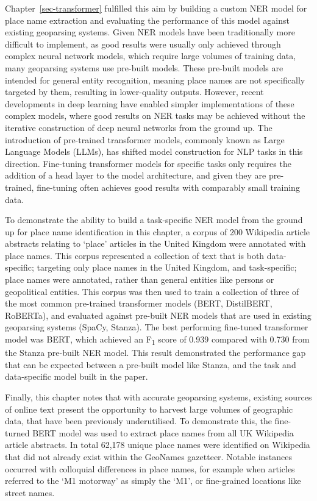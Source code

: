 \documentclass[
  letterpaper,
  11pt,
  english,
  onehalfspacing,
  headsepline]{MastersDoctoralThesis}
\begin{document}
Chapter~\ref{sec-transformer} fulfilled this aim by building a custom
NER model for place name extraction and evaluating the performance of
this model against existing geoparsing systems. Given NER models have
been traditionally more difficult to implement, as good results were
usually only achieved through complex neural network models, which
require large volumes of training data, many geoparsing systems use
pre-built models. These pre-built models are intended for general entity
recognition, meaning place names are not specifically targeted by them,
resulting in lower-quality outputs. However, recent developments in deep
learning have enabled simpler implementations of these complex models,
where good results on NER tasks may be achieved without the iterative
construction of deep neural networks from the ground up. The
introduction of pre-trained transformer models, commonly known as Large
Language Models (LLMs), has shifted model construction for NLP tasks in
this direction. Fine-tuning transformer models for specific tasks only
requires the addition of a head layer to the model architecture, and
given they are pre-trained, fine-tuning often achieves good results with
comparably small training data.

To demonstrate the ability to build a task-specific NER model from the
ground up for place name identification in this chapter, a corpus of 200
Wikipedia article abstracts relating to `place' articles in the United
Kingdom were annotated with place names. This corpus represented a
collection of text that is both data-specific; targeting only place
names in the United Kingdom, and task-specific; place names were
annotated, rather than general entities like persons or geopolitical
entities. This corpus was then used to train a collection of three of
the most common pre-trained transformer models (BERT, DistilBERT,
RoBERTa), and evaluated against pre-built NER models that are used in
existing geoparsing systems (SpaCy, Stanza). The best performing
fine-tuned transformer model was BERT, which achieved an
F\textsubscript{1} score of 0.939 compared with 0.730 from the Stanza
pre-built NER model. This result demonstrated the performance gap that
can be expected between a pre-built model like Stanza, and the task and
data-specific model built in the paper.

Finally, this chapter notes that with accurate geoparsing systems,
existing sources of online text present the opportunity to harvest large
volumes of geographic data, that have been previously underutilised. To
demonstrate this, the fine-turned BERT model was used to extract place
names from all UK Wikipedia article abstracts. In total 62,178 unique
place names were identified on Wikipedia that did not already exist
within the GeoNames gazetteer. Notable instances occurred with
colloquial differences in place names, for example when articles
referred to the `M1 motorway' as simply the `M1', or fine-grained
locations like street names.
\end{document}
